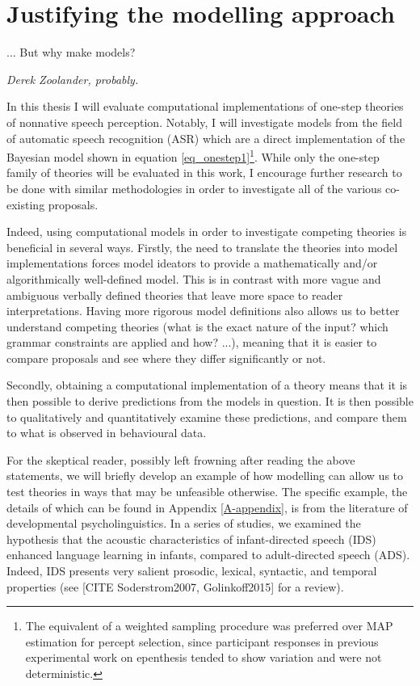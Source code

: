 \section{Justifying the modelling approach}
\setlength{\epigraphwidth}{0.4\textwidth}
\epigraph{... But why make models?}{\textit{Derek Zoolander, probably.}}


In this thesis I will evaluate computational implementations of one-step theories of nonnative speech perception. Notably, I will investigate models from the field of automatic speech recognition (ASR) which are a direct implementation of the Bayesian model shown in equation \ref{eq_onestep1}\footnote{The equivalent of a weighted sampling procedure was preferred over MAP estimation for percept selection, since participant responses in previous experimental work on epenthesis tended to show variation and were not deterministic.}. 
While only the one-step family of theories will be evaluated in this work, I encourage further research to be done with similar methodologies in order to investigate all of the various co-existing proposals.

Indeed, using computational models in order to investigate competing theories is beneficial in several ways. Firstly, the need to translate the theories into model implementations forces model ideators to provide a mathematically and/or algorithmically well-defined model. This is in contrast with more vague and ambiguous verbally defined theories that leave more space to reader interpretations. Having more rigorous model definitions also allows us to better understand competing theories (what is the exact nature of the input? which grammar constraints are applied and how? ...), meaning that it is easier to compare proposals and see where they differ significantly or not. 

Secondly, obtaining a computational implementation of a theory means that it is then possible to derive predictions from the models in question. It is then possible to qualitatively and quantitatively examine these predictions, and compare them to what is observed in behavioural data.

For the skeptical reader, possibly left frowning after reading the above statements, we will briefly develop an example of how modelling can allow us to test theories in ways that may be unfeasible otherwise. The specific example, the details of which can be found in Appendix \ref{A-appendix}, is from the literature of developmental psycholinguistics. In a series of studies, we examined the hypothesis that the acoustic characteristics of infant-directed speech (IDS) enhanced language learning in infants, compared to adult-directed speech (ADS). Indeed, IDS presents very salient prosodic, lexical, syntactic, and temporal properties (see [CITE Soderstrom2007, Golinkoff2015] for a review).

